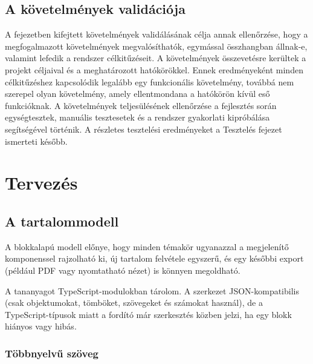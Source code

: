 \documentclass[12pt,a4paper]{report}
\begin{document}
\section{A követelmények validációja}
A fejezetben kifejtett követelmények validálásának célja annak ellenőrzése,
 hogy a megfogalmazott követelmények megvalósíthatók, egymással összhangban
  állnak-e, valamint lefedik a rendszer célkitűzéseit.
   A követelmények összevetésre kerültek a projekt céljaival és a 
   meghatározott hatókörökkel. 
   Ennek eredményeként minden célkitűzéshez kapcsolódik legalább 
   egy funkcionális követelmény, továbbá nem szerepel olyan követelmény, 
   amely ellentmondana a hatókörön kívül eső funkcióknak. 
   A követelmények teljesülésének ellenőrzése a fejlesztés során 
   egységtesztek, manuális tesztesetek és a rendszer gyakorlati 
   kipróbálása segítségével történik.
    A részletes tesztelési eredményeket a Tesztelés fejezet ismerteti később.
\chapter{Tervezés}

\section{A tartalommodell}
\label{sec:content-design}

A blokkalapú modell előnye, hogy minden témakör ugyanazzal a
megjelenítő komponenssel rajzolható ki, új tartalom felvétele egyszerű,
és egy későbbi export (például PDF vagy nyomtatható nézet) is könnyen
megoldható.

A tananyagot TypeScript-modulokban tárolom. A szerkezet JSON-kompatibilis
(csak objektumokat, tömböket, szövegeket és számokat használ), de a
TypeScript-típusok miatt a fordító már szerkesztés közben jelzi, ha
egy blokk hiányos vagy hibás.

\subsection{Többnyelvű szöveg}
\end{document}
